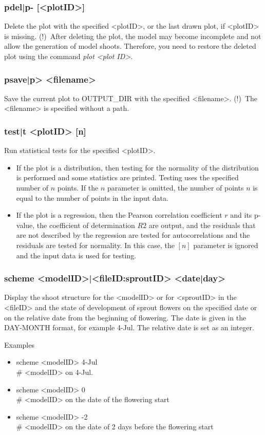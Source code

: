 \documentclass[a4paper]{article}
\begin{document}
\subsubsection{pdel|p- [<plotID>]}
Delete the plot with the specified <plotID>, or the last drawn plot, if <plotID> is missing. (!)~After deleting the plot, the model may become incomplete and not allow the generation of model shoots. Therefore, you need to restore the deleted plot using the command \textit{plot <plot ID>}.

\subsubsection{psave|p> <filename>}
Save the current plot to OUTPUT\_DIR with the specified <filename>. (!)~The <filename> is specified without a path.

\subsubsection{test|t <plotID> [n]}
Run statistical tests for the specified <plotID>.
\begin{itemize}
\item If the plot is a distribution, then testing for the normality of the distribution is performed and some statistics are printed. Testing uses the specified number of $n$ points. If the $n$ parameter is omitted, the number of points $n$ is equal to the number of points in the input data.
\item If the plot is a regression, then the Pearson correlation coefficient $r$ and its p-value, the coefficient of determination $R2$ are output, and the residuals that are not described by the regression are tested for autocorrelations and the residuals are tested for normality. In this case, the $[n]$ parameter is ignored and the input data is used for testing.
\end{itemize}

\subsubsection{scheme <modelID>|<fileID:sproutID> <date|day>}
Display the shoot structure for the <modelID> or for <sproutID> in the <fileID> and the state of development of sprout flowers on the specified date or on the relative date from the beginning of flowering. The date is given in the DAY-MONTH format, for example 4-Jul. The relative date is set as an integer.

Examples
\begin{itemize}
\item scheme <modelID> 4-Jul    
\\ \# <modelID> on 4-Jul.

\item scheme <modelID> 0        
\\ \# <modelID> on the date of the flowering start

\item scheme <modelID> -2
\\ \# <modelID> on the date of 2 days before the flowering start

\end{itemize}
\end{document}
